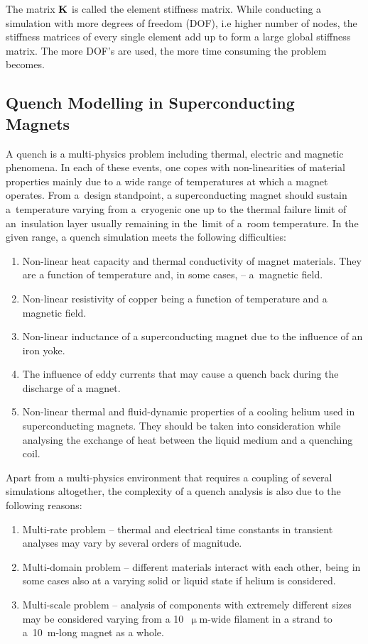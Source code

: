 The matrix $\textbf{K}$ is called the element stiffness matrix. While conducting a simulation with more degrees of freedom (DOF), i.e higher number of nodes, the stiffness matrices of every single element add up to form a large global stiffness matrix. The more DOF's are used, the more time consuming the problem becomes.

\subsection{Quench Modelling in Superconducting Magnets}

A quench is a multi-physics problem including thermal, electric and magnetic phenomena. In each of these events, one copes with non-linearities of material properties mainly due to a wide range of temperatures at which a magnet operates. From a~design standpoint, a superconducting magnet should sustain a~temperature varying from a~cryogenic one up to the thermal failure limit of an~insulation layer usually remaining in the~limit of a~room temperature. In the given range, a quench simulation meets the following difficulties: 

\begin{enumerate}
    \item Non-linear heat capacity and thermal conductivity of magnet materials. They are a function of temperature and, in some cases, -- a~magnetic field. 
    \item Non-linear resistivity of copper being a function of temperature and a magnetic field.
    \item Non-linear inductance of a superconducting magnet due to the influence of an iron yoke. 
    \item The influence of eddy currents that may cause a quench back during the discharge of a magnet.
    \item Non-linear thermal and fluid-dynamic properties of a cooling helium used in superconducting magnets. They should be taken into consideration while analysing the exchange of heat between the liquid medium and a quenching coil. 
\end{enumerate}

Apart from a multi-physics environment that requires a coupling of several simulations altogether, the complexity of a quench analysis is also due to the following reasons: 
\begin{enumerate}
    \item Multi-rate problem -- thermal and electrical time constants in transient analyses may vary by several orders of magnitude.
    \item Multi-domain problem -- different materials interact with each other, being in some cases also at a varying solid or liquid state if helium is considered.
    \item Multi-scale problem -- analysis of components with extremely different sizes may be considered varying from a 10~$\upmu$m-wide filament in a strand to a~10~m-long magnet as a whole.
\end{enumerate}

